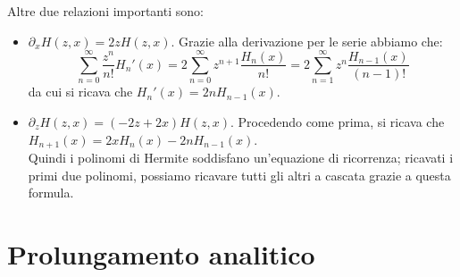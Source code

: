 Altre due relazioni importanti sono:
\begin{itemize}
\item $\partial_x H(z,x)=2zH(z,x)$. Grazie alla derivazione per le serie abbiamo che: $$\sum_{n=0} ^{\infty} \frac{z^n}{n!}H_n'(x)=2\sum_{n=0} ^{\infty} z^{n+1} \frac{H_n(x)}{n!}=2\sum_{n=1} ^{\infty} z^n \frac{H_{n-1}(x)}{(n-1)!}$$
da cui si ricava che $H_n'(x)=2nH_{n-1}(x)$.
\item $\partial_z H(z,x)=(-2z+2x)H(z,x)$. Procedendo come prima, si ricava che $H_{n+1}(x)=2xH_n(x) -2nH_{n-1}(x)$.\\Quindi i polinomi di Hermite soddisfano un'equazione di ricorrenza; ricavati i primi due polinomi, possiamo ricavare tutti gli altri a cascata grazie a questa formula.
\end{itemize}

\section{Prolungamento analitico}

